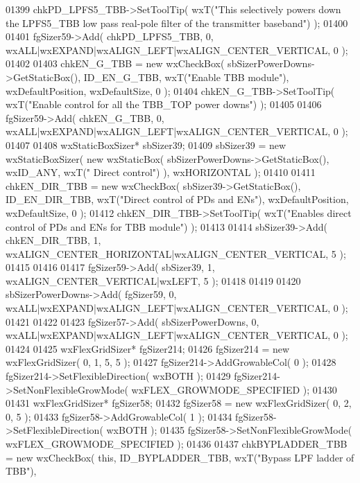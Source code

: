 \begin{DoxyCode}
01399     chkPD_LPFS5_TBB->SetToolTip( wxT(\textcolor{stringliteral}{"This selectively powers down the LPFS5\_TBB low pass real-pole filter
       of the transmitter baseband"}) );
01400     
01401     fgSizer59->Add( chkPD_LPFS5_TBB, 0, wxALL|wxEXPAND|wxALIGN\_LEFT|wxALIGN\_CENTER\_VERTICAL, 0 );
01402     
01403     chkEN_G_TBB = \textcolor{keyword}{new} wxCheckBox( sbSizerPowerDowns->GetStaticBox(), ID_EN_G_TBB, wxT(\textcolor{stringliteral}{"Enable TBB module"}),
       wxDefaultPosition, wxDefaultSize, 0 );
01404     chkEN_G_TBB->SetToolTip( wxT(\textcolor{stringliteral}{"Enable control for all the TBB\_TOP power downs"}) );
01405     
01406     fgSizer59->Add( chkEN_G_TBB, 0, wxALL|wxEXPAND|wxALIGN\_LEFT|wxALIGN\_CENTER\_VERTICAL, 0 );
01407     
01408     wxStaticBoxSizer* sbSizer39;
01409     sbSizer39 = \textcolor{keyword}{new} wxStaticBoxSizer( \textcolor{keyword}{new} wxStaticBox( sbSizerPowerDowns->GetStaticBox(), wxID\_ANY, wxT(\textcolor{stringliteral}{"
      Direct control"}) ), wxHORIZONTAL );
01410     
01411     chkEN_DIR_TBB = \textcolor{keyword}{new} wxCheckBox( sbSizer39->GetStaticBox(), ID_EN_DIR_TBB, wxT(\textcolor{stringliteral}{"Direct control of PDs
       and ENs"}), wxDefaultPosition, wxDefaultSize, 0 );
01412     chkEN_DIR_TBB->SetToolTip( wxT(\textcolor{stringliteral}{"Enables direct control of PDs and ENs for TBB module"}) );
01413     
01414     sbSizer39->Add( chkEN_DIR_TBB, 1, wxALIGN\_CENTER\_HORIZONTAL|wxALIGN\_CENTER\_VERTICAL, 5 );
01415     
01416     
01417     fgSizer59->Add( sbSizer39, 1, wxALIGN\_CENTER\_VERTICAL|wxLEFT, 5 );
01418     
01419     
01420     sbSizerPowerDowns->Add( fgSizer59, 0, wxALL|wxEXPAND|wxALIGN\_LEFT|wxALIGN\_CENTER\_VERTICAL, 0 );
01421     
01422     
01423     fgSizer57->Add( sbSizerPowerDowns, 0, wxALL|wxEXPAND|wxALIGN\_LEFT|wxALIGN\_CENTER\_VERTICAL, 0 );
01424     
01425     wxFlexGridSizer* fgSizer214;
01426     fgSizer214 = \textcolor{keyword}{new} wxFlexGridSizer( 0, 1, 5, 5 );
01427     fgSizer214->AddGrowableCol( 0 );
01428     fgSizer214->SetFlexibleDirection( wxBOTH );
01429     fgSizer214->SetNonFlexibleGrowMode( wxFLEX\_GROWMODE\_SPECIFIED );
01430     
01431     wxFlexGridSizer* fgSizer58;
01432     fgSizer58 = \textcolor{keyword}{new} wxFlexGridSizer( 0, 2, 0, 5 );
01433     fgSizer58->AddGrowableCol( 1 );
01434     fgSizer58->SetFlexibleDirection( wxBOTH );
01435     fgSizer58->SetNonFlexibleGrowMode( wxFLEX\_GROWMODE\_SPECIFIED );
01436     
01437     chkBYPLADDER_TBB = \textcolor{keyword}{new} wxCheckBox( \textcolor{keyword}{this}, ID_BYPLADDER_TBB, wxT(\textcolor{stringliteral}{"Bypass LPF ladder of TBB"}), 

\end{DoxyCode}
